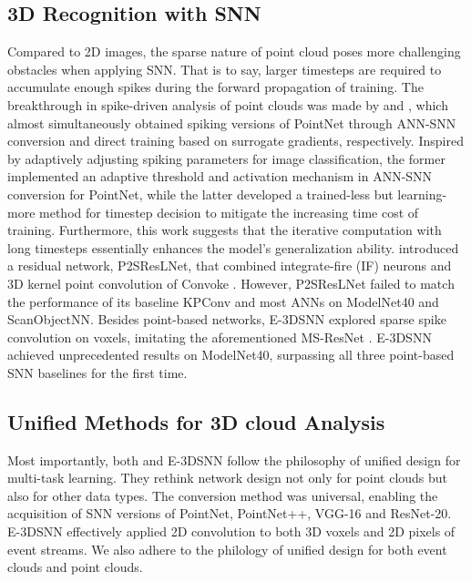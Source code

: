 \subsection{3D Recognition with SNN}
Compared to 2D images, the sparse nature of point cloud poses more challenging obstacles when applying SNN. That is to say, larger timesteps are required to accumulate enough spikes during the forward propagation of training. The breakthrough in spike-driven analysis of point clouds was made by \cite{lan2023efficient} and \cite{ren2024spiking}, which almost simultaneously obtained spiking versions of PointNet through ANN-SNN conversion and direct training based on surrogate gradients, respectively. Inspired by adaptively adjusting spiking parameters for image classification, the former implemented an adaptive threshold and activation mechanism in ANN-SNN conversion for PointNet, while the latter developed a trained-less but learning-more method for timestep decision to mitigate the increasing time cost of training. Furthermore, 
this work suggests that the iterative computation with long timesteps essentially enhances the model's generalization ability. \cite{wu2024point} introduced a residual network, P2SResLNet, that combined integrate-fire (IF) neurons and 3D kernel point convolution of Convoke \cite{thomas2019kpconv}. However, P2SResLNet failed to match the performance of its baseline KPConv and most ANNs on ModelNet40 and ScanObjectNN. Besides point-based networks, E-3DSNN \cite{qiu2024efficient} explored sparse spike convolution on voxels, imitating the aforementioned MS-ResNet \cite{MS_ResNet}. E-3DSNN achieved unprecedented results on ModelNet40, surpassing all three point-based SNN baselines for the first time.
\subsection{Unified Methods for 3D cloud Analysis}
Most importantly, both \cite{lan2023efficient} and E-3DSNN follow the philosophy of unified design for multi-task learning. They rethink network design not only for point clouds but also for other data types. The conversion method was universal, enabling the acquisition of SNN versions of PointNet, PointNet++, VGG-16 and ResNet-20. E-3DSNN effectively applied 2D convolution to both 3D voxels and 2D pixels of event streams. We also adhere to the philology of unified design for both event clouds and point clouds. 


